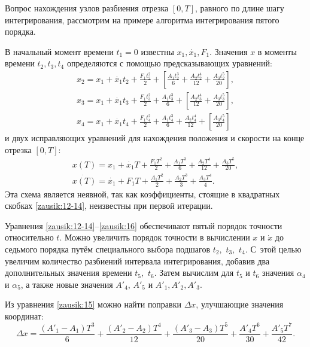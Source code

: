 \smallskip

Вопрос нахождения узлов разбиения отрезка $[0, T]$, равного по длине шагу интегрирования, рассмотрим на примере алгоритма интегрирования пятого порядка.

В начальный момент времени $t_1=0$ известны $x_1, \dot{x_1}, F_1$. Значения $x$ в моменты времени $t_2, t_3, t_4$ определяются с помощью предсказывающих уравнений:
\begin{equation}
\begin{array}{l}
\displaystyle x_2=x_1+\dot{x_1}t_2+\frac{F_1 t^2_2}{2}+\left[\frac{A_1 t^3_2}{6}+\frac{A_2 t^4_2}{12}+\frac{A_3 t^5_2}{20}\right],\\[2mm]
\displaystyle  x_3=x_1+\dot{x_1}t_3+\frac{F_1 t^2_3}{2}+\frac{A_1 t^3_3}{6}+\left[\frac{A_2 t^4_3}{12}+\frac{A_3 t^5_3}{20}\right],\\[2mm]
\displaystyle x_4=x_1+\dot{x_1}t_4+\frac{F_1 t^2_4}{2}+\frac{A_1 t^3_4}{6}+\frac{A_2 t^4_4}{12}+\left[\frac{A_3 t^5_4}{20}\right]
\end{array}
\label{zausik:12-14}
\end{equation}
и двух исправляющих уравнений для нахождения положения и скорости на конце отрезка  $[0,T]$:
\begin{gather}
x(T)=x_1+\dot{x_1}T+\frac{F_1 T^2}{2}+\frac{A_1 T^3}{6}+\frac{A_2 T^4}{12}+\frac{A_3 T^5}{20},
\label{zausik:15}
\\
\dot{x(T)}=\dot{x_1}+F_1 T+\frac{A_1 T^2}{2}+\frac{A_2 T^3}{3}+\frac{A_3 T^4}{4}.
\label{zausik:16}
\end{gather}	
Эта схема является неявной, так как коэффициенты, стоящие в квадратных скобках \eqref{zausik:12-14}, неизвестны при первой итерации.

Уравнения \eqref{zausik:12-14}--\eqref{zausik:16} обеспечивают пятый порядок точности относительно $t$. 
Можно увеличить порядок точности в вычислении $x$ и $\dot{x}$ до седьмого порядка путём специального выбора подшагов $t_2,$ $t_3,$ $t_4$. 
С~этой целью увеличим количество разбиений интервала интегрирования, добавив два дополнительных значения времени $t_5,$ $t_6$. Затем вычислим для $t_5$ и $t_6$ значения $\alpha_4$ и $\alpha_5$, а также новые значения $A'_4$, $A'_5$ и $A'_1, A'_2, A'_3$.

Из уравнения \eqref{zausik:15} можно найти поправки $\Delta x$, улучшающие значения координат:
\begin{equation}
\Delta x=\frac{(A'_1-A_1)T^3}{6}+\frac{(A'_2-A_2)T^4}{12}+\frac{(A'_3-A_3)T^5}{20}+\frac{A'_4 T^6}{30}+\frac{A'_5 T^7}{42}.
\label{zausik:17}
\end{equation}

